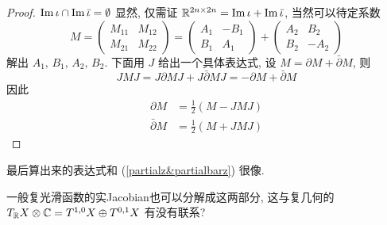             \begin{proof}
                ${\rm Im}\,\iota\cap{\rm Im}\,\bar{\iota}=\emptyset$ 显然, 仅需证 $\mathbb{R}^{2n\times2n} = {\rm Im}\,\iota+{\rm Im}\,\bar{\iota}$,
                当然可以待定系数
                \begin{equation*}
                    M =  \begin{pmatrix} M_{11} & M_{12} \\ M_{21} & M_{22} \end{pmatrix} = 
                    \begin{pmatrix} A_1 & -B_1 \\ B_1 & A_1 \end{pmatrix} + 
                    \begin{pmatrix} A_2 & B_2 \\ B_2 & -A_2 \end{pmatrix}
                \end{equation*}
                解出 $A_1,\,B_1,\,A_2,\,B_2$. 下面用 $J$ 给出一个具体表达式, 设 $M = \partial M + \bar{\partial}M$, 则
                \begin{equation*}
                    JMJ = J\partial MJ + J\bar{\partial}MJ = -\partial M + \bar{\partial}M
                \end{equation*}
                因此
                \begin{equation}
                    \begin{aligned}
                        \partial M &= \frac{1}{2}(M - JMJ) \\
                    \bar{\partial}M &= \frac{1}{2}(M + JMJ)
                    \end{aligned}
                \end{equation}
            \end{proof}
            \begin{remark}
                最后算出来的表达式和 {\rm (\ref{partialz&partialbarz})} 很像.
            \end{remark}
            \begin{remark}
                一般复光滑函数的实{\rm Jacobian}也可以分解成这两部分, 这与复几何的 $T_{\mathbb{R}}X\otimes\mathbb{C} = T^{1,0}X\oplus T^{0,1}X$ 有没有联系?
            \end{remark}
